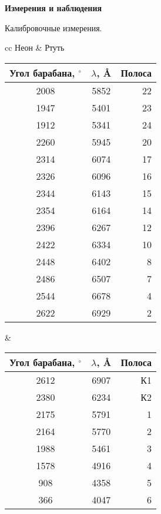 \documentclass[12pt]{article}
\begin{document}
\begin{center}
    \textbf{Измерения и наблюдения}
\end{center}
Калибровочные измерения.
\begin{center}
    \begin{tabular}{cc}
      Неон & Ртуть \\
      \begin{tabular}{|c|c|r|}
        \hline
        Угол барабана, $^{\circ}$ & $\lambda$, \AA &Полоса \\ \hline
        2008&5852&22 \\ \hline
        1947&5401&23 \\ \hline
        1912&5341&24 \\ \hline
        2260&5945&20 \\ \hline
        2314&6074&17 \\ \hline
        2326&6096&16 \\ \hline
        2344&6143&15 \\ \hline
        2354&6164&14 \\ \hline
        2396&6267&12 \\ \hline
        2422&6334&10 \\ \hline
        2448&6402&8 \\ \hline
        2486&6507&7 \\ \hline
        2544&6678&4 \\ \hline
        2622&6929&2 \\ \hline
      \end{tabular}      &     \begin{tabular}{|c|c|r|}
                                 \hline
                                 Угол барабана, $^{\circ}$ & $\lambda$, \AA &Полоса \\ \hline
                                 2612&6907&К1 \\ \hline
                                 2380&6234&К2 \\ \hline
                                 2175&5791&1 \\ \hline
                                 2164&5770&2 \\ \hline
                                 1988&5461&3 \\ \hline
                                 1578&4916&4 \\ \hline
                                 908&4358&5 \\ \hline
                                 366&4047&6 \\ \hline
                               \end{tabular}
    \end{tabular}
\end{center} 
\end{document}
